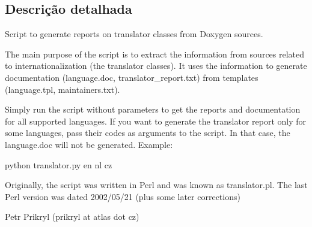 \subsection{Descrição detalhada}
\begin{DoxyVerb}Script to generate reports on translator classes from Doxygen sources.

  The main purpose of the script is to extract the information from sources
  related to internationalization (the translator classes). It uses the
  information to generate documentation (language.doc,
  translator_report.txt) from templates (language.tpl, maintainers.txt).

  Simply run the script without parameters to get the reports and
  documentation for all supported languages. If you want to generate the
  translator report only for some languages, pass their codes as arguments
  to the script. In that case, the language.doc will not be generated.
  Example:

    python translator.py en nl cz

  Originally, the script was written in Perl and was known as translator.pl.
  The last Perl version was dated 2002/05/21 (plus some later corrections)

                                         Petr Prikryl (prikryl at atlas dot cz)


\end{DoxyVerb}
